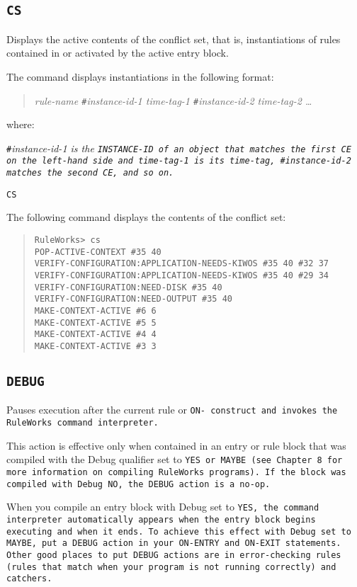 \subsection{\tt{CS}}

Displays the active contents of the conflict set, that is,
instantiations of rules contained in or activated by the active entry
block.

The command displays instantiations in the following format:
\begin{quote}
  \it{rule-name} \verb|#|\it{instance-id-1} \it{time-tag-1}
  \verb|#|\it{instance-id-2} \it{time-tag-2} \ldots
\end{quote}
where:

\verb|#|\it{instance-id-1} is the \tt{INSTANCE-ID} of an object that matches
the first CE on the left-hand side and \it{time-tag-1} is its
time-tag, \verb|#|\it{instance-id-2} matches the second CE, and so on.

\Format

\tt{CS}

\Example

The following command displays the contents of the conflict set:

\begin{quote}
\begin{verbatim}
RuleWorks> cs
POP-ACTIVE-CONTEXT #35 40
VERIFY-CONFIGURATION:APPLICATION-NEEDS-KIWOS #35 40 #32 37
VERIFY-CONFIGURATION:APPLICATION-NEEDS-KIWOS #35 40 #29 34
VERIFY-CONFIGURATION:NEED-DISK #35 40
VERIFY-CONFIGURATION:NEED-OUTPUT #35 40
MAKE-CONTEXT-ACTIVE #6 6
MAKE-CONTEXT-ACTIVE #5 5
MAKE-CONTEXT-ACTIVE #4 4
MAKE-CONTEXT-ACTIVE #3 3
\end{verbatim}
\end{quote}

\subsection{\tt{DEBUG}}

Pauses execution after the current rule or \tt{ON-} construct and
invokes the RuleWorks command interpreter.

This action is effective only when contained in an entry or rule block
that was compiled with the Debug qualifier set to \tt{YES} or
\tt{MAYBE} (see Chapter 8 for more information on compiling RuleWorks
programs). If the block was compiled with Debug \tt{NO}, the
\tt{DEBUG} action is a no-op.

When you compile an entry block with Debug set to \tt{YES}, the
command interpreter automatically appears when the entry block begins
executing and when it ends. To achieve this effect with Debug set to
\tt{MAYBE}, put a \tt{DEBUG} action in your \tt{ON-ENTRY} and
\tt{ON-EXIT} statements. Other good places to put \tt{DEBUG} actions
are in error-checking rules (rules that match when your program is not
running correctly) and catchers.

